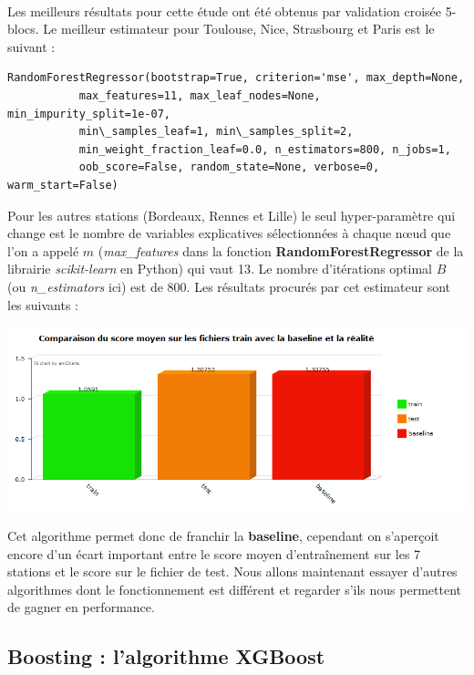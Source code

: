 \documentclass[14pt, openany]{article}
\begin{document}
\paragraph{}
Les meilleurs résultats pour cette étude ont été obtenus par validation croisée 5-blocs. Le meilleur estimateur pour Toulouse, Nice, Strasbourg et Paris est le suivant :
\begin{verbatim}
RandomForestRegressor(bootstrap=True, criterion='mse', max_depth=None,
           max_features=11, max_leaf_nodes=None, min_impurity_split=1e-07,
           min\_samples_leaf=1, min\_samples_split=2,
           min_weight_fraction_leaf=0.0, n_estimators=800, n_jobs=1,
           oob_score=False, random_state=None, verbose=0, warm_start=False)
\end{verbatim}
Pour les autres stations (Bordeaux, Rennes et Lille) le seul hyper-paramètre qui change est le nombre de variables explicatives sélectionnées à chaque nœud que l'on a appelé $m$ (\textit{max\_features} dans la fonction \textbf{RandomForestRegressor} de la librairie \textit{scikit-learn} en Python) qui vaut 13. Le nombre d'itérations optimal $B$ (ou \textit{n\_estimators} ici) est de 800. Les résultats procurés par cet estimateur sont les suivants :\\
\begin{center}
\includegraphics[width=18cm]{Images/score_rf.png}
\end{center}
\begin{center}
\label{fig1}
\end{center}
Cet algorithme permet donc de franchir la \textbf{baseline}, cependant on s'aperçoit encore d'un écart important entre le score moyen d'entraînement sur les 7 stations et le score sur le fichier de test. Nous allons maintenant essayer d'autres algorithmes dont le fonctionnement est différent et regarder s'ils nous permettent de gagner en performance.
\subsection{Boosting : l'algorithme XGBoost}
\end{document}

